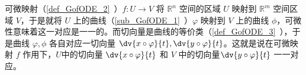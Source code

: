 
可微映射（\autoref{def_GofODE_2}~）$f:U\rightarrow V$ 将 $\mathbb R^n$ 空间的区域 $U$ 映射到 $\mathbb R^m$ 空间区域 $V$，于是就将 $U$ 上的曲线（\autoref{sub_GofODE_1}~）$\varphi$ 映射到 $V$ 上的曲线 $\phi$，可微性意味着这一对应是一一的。而切向量是曲线的等价类（\autoref{def_GofODE_3}~），于是曲线 $\varphi,\phi$ 各自对应一切向量 $\dv{x\circ\varphi}{t},\dv{y\circ\varphi}{t}$。这就是说在可微映射 $f$ 作用下，$U$中的切向量 $\dv{x\circ\varphi}{t}$ 和 $V$ 中的切向量$\dv{y\circ\varphi}{t}$ 一一对应。 